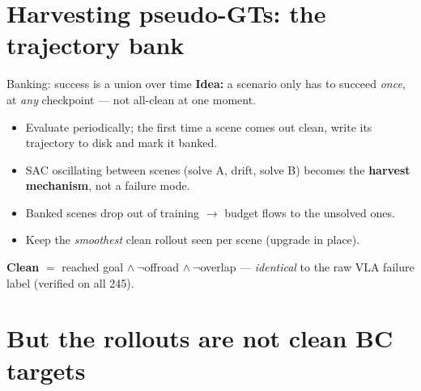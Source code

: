\section{Harvesting pseudo-GTs: the trajectory bank}

\begin{frame}{Banking: success is a union over time}
  \textbf{Idea:} a scenario only has to succeed \emph{once}, at \emph{any} checkpoint ---
  not all-clean at one moment.
  \begin{itemize}
    \item Evaluate periodically; the first time a scene comes out clean, write its
          trajectory to disk and mark it banked.
    \item SAC oscillating between scenes (solve A, drift, solve B) becomes the
          \textbf{harvest mechanism}, not a failure mode.
    \item Banked scenes drop out of training $\rightarrow$ budget flows to the unsolved ones.
    \item Keep the \emph{smoothest} clean rollout seen per scene (upgrade in place).
  \end{itemize}

  \vspace{0.5em}
  \textbf{Clean} $=$ reached goal $\wedge\ \neg$offroad $\wedge\ \neg$overlap ---
  \emph{identical} to the raw VLA failure label (verified on all 245).
\end{frame}

\section{But the rollouts are not clean BC targets}

